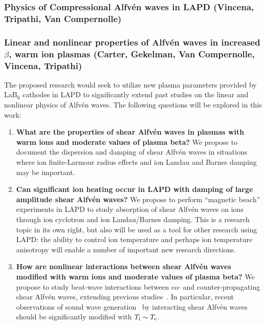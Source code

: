 \documentclass[11pt]{article}
\newcommand\Alfven{Alfv\'en }
\renewcommand{\cite}{\citep}
\begin{document}
\subsubsection{Physics of Compressional \Alfven waves in LAPD (Vincena, Tripathi,
Van Compernolle)}




\subsubsection{Linear and nonlinear properties of Alfv\'{e}n waves in
  increased $\beta$, warm ion plasmas (Carter, Gekelman, Van
  Compernolle, Vincena, Tripathi)}

The proposed research would seek to utilize new plasma parameters
provided by LaB$_6$ cathodes in LAPD to significantly extend past
studies on the linear and nonlinear physics of Alfv\'{e}n waves.  The
following questions will be explored in this work:

\begin{enumerate}
\item {\bfseries What are the properties of shear Alfv\'{e}n waves in
  plasmas with warm ions and moderate values of plasma beta?}  We
  propose to document the dispersion and damping of shear Alfv\'{e}n
  waves in situations where ion finite-Larmour radius effects and ion
  Landau and Barnes damping may be important. 

\item {\bfseries Can significant ion heating occur in LAPD with
  damping of large amplitude shear Alfv\'{e}n waves?} We propose to
  perform ``magnetic beach'' experiments in LAPD to study absorption
  of shear Alfv\'{e}n waves on ions through ion cyclotron and ion
  Landau/Barnes damping.  This is a research topic in its own right,
  but also will be used as a tool for other research using
  LAPD:  the ability to control ion temperature and perhaps ion
  temperature anisotropy will enable a number of important new
  research directions. 

\item {\bfseries How are nonlinear interactions between shear
  Alfv\'{e}n waves modified with warm ions and moderate values of
  plasma beta?} We propose to study beat-wave interactions between co-
  and counter-propagating shear Alfv\'{e}n waves, extending previous
  studies~\cite{carter:2006,auerbach:2010,auerbach:2011,dorfman:2013,dorfman:2015}.
  In particular, recent observations of sound wave generation~\cite{dorfman:2013,dorfman:2015} by
  interacting shear Alfv\'{e}n waves should be significantly modified
  with $T_{\rm i} \sim T_{\rm e}$.

\end{enumerate}
\end{document}
